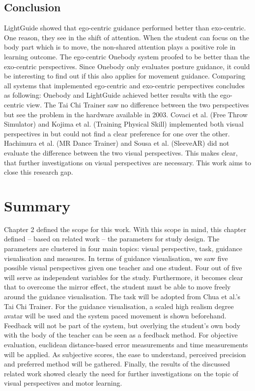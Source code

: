 \subsection{Conclusion}
LightGuide showed that ego-centric guidance performed better than exo-centric. One reason, they see in the shift of attention. When the student can focus on the body part which is to move, the non-shared attention plays a positive role in learning outcome. The ego-centric Onebody system proofed to be better than the exo-centric perspectives. Since Onebody only evaluates posture guidance, it could be interesting to find out if this also applies for movement guidance. Comparing all systems that implemented ego-centric and exo-centric perspectives concludes as following: Onebody and LightGuide achieved better results with the ego-centric view. The Tai Chi Trainer saw no difference between the two perspectives but see the problem in the hardware available in 2003. Covaci et al. (Free Throw Simulator) \cite{Covaci2014} and Kojima et al. (Training Physical Skill) \cite{Kojima2014} implemented both visual perspectives in but could not find a clear preference for one over the other. Hachimura et al. (MR Dance Trainer) \cite{Hachimura2004} and Sousa et al. (SleeveAR) \cite{Sousa2016} did not evaluate the difference between the two visual perspectives. This makes clear, that further investigations on visual perspectives are necessary. This work aims to close this research gap.

\section{Summary}
Chapter 2 defined the scope for this work. With this scope in mind, this chapter defined \--- based on related work \--- the parameters for study design. The parameters are clustered in four main topics: visual perspective, task, guidance visualisation and measures. In terms of guidance visualisation, we saw five possible visual perspectives given one teacher and one student. Four out of five will serve as independent variables for the study. Furthermore, it becomes clear that to overcome the mirror effect, the student must be able to move freely around the guidance visualisation. The task will be adopted from Chua et al.'s Tai Chi Trainer. For the guidance visualisation, a scaled high realism degree avatar will be used and the system paced movement is shown beforehand. Feedback will not be part of the system, but overlying the student's own body with the body of the teacher can be seen as a feedback method. For objective evaluation, euclidean distance-based error measurements and time measurements will be applied. As subjective scores, the ease to understand, perceived precision and preferred method will be gathered. Finally, the results of the discussed related work showed clearly the need for further investigations on the topic of visual perspectives and motor learning.


